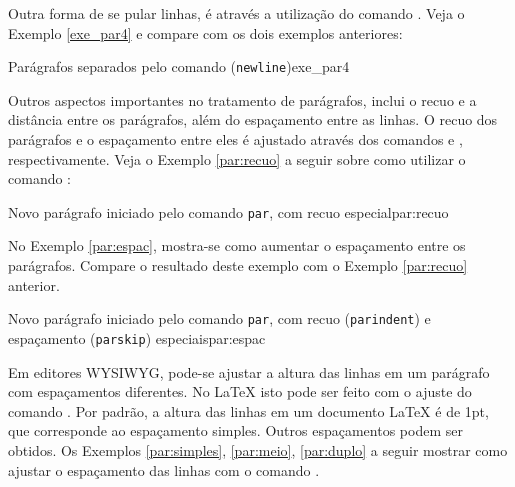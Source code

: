 Outra forma de se pular linhas, é através a utilização do comando \texttt{\newline}. Veja o Exemplo \ref{exe_par4} e compare com os dois exemplos anteriores:

\begin{texexptitled}[breakable,enhanced,middle=2mm]{Parágrafos separados pelo comando ({\tt newline})}{exe_par4}
\lipsumsentence[1-4]
\newline
\lipsumsentence[5-8]
\end{texexptitled}

Outros aspectos importantes no tratamento de parágrafos, inclui o recuo e a distância entre os parágrafos, além do espaçamento entre as linhas. O recuo dos parágrafos e o espaçamento entre eles é ajustado através dos comandos \texttt{\parindent} e \texttt{\parskip}, respectivamente. Veja o Exemplo \ref{par:recuo} a seguir sobre como utilizar o comando \texttt{\parindent}:

\begin{texexptitled}[breakable,enhanced,middle=2mm]{Novo parágrafo iniciado pelo comando {\tt par}, com recuo especial}{par:recuo}
\setlength{\parindent}{3em}

\lipsumsentence[1-4] \par
\lipsumsentence[5-8]
\end{texexptitled} 

No Exemplo \ref{par:espac}, mostra-se como aumentar o espaçamento entre os parágrafos. Compare o resultado deste exemplo com o Exemplo \ref{par:recuo} anterior.

\begin{texexptitled}[breakable,enhanced,middle=2mm]{Novo parágrafo iniciado pelo comando {\tt par}, com recuo ({\tt parindent}) e espaçamento ({\tt parskip}) especiais}{par:espac}
\setlength{\parindent}{3em}
\setlength{\parskip}{1em}

\lipsumsentence[1-4] \par
\lipsumsentence[5-8]
\end{texexptitled}

Em editores WYSIWYG, pode-se ajustar a altura das linhas em um parágrafo com espaçamentos diferentes. No \LaTeX{} isto pode ser feito com o ajuste do comando \texttt{\baselinestretch}. Por padrão, a altura das linhas em um documento \LaTeX{} é de {1pt}, que corresponde ao espaçamento simples. Outros espaçamentos podem ser obtidos. Os Exemplos \ref{par:simples}, \ref{par:meio}, \ref{par:duplo} a seguir mostrar como ajustar o espaçamento das linhas com o comando \texttt{\baselinestretch}.

